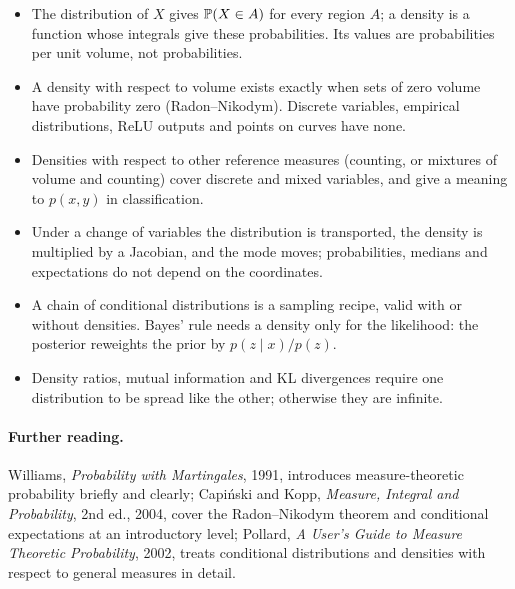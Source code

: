\begin{notechapter}
\begin{chaptersummary}
\begin{itemize}
  \item The distribution of $X$ gives $\mathbb{P}(X\in A)$ for every region $A$; a density is a function whose
        integrals give these probabilities. Its values are probabilities per unit volume, not probabilities.
  \item A density with respect to volume exists exactly when sets of zero volume have probability zero
        (Radon--Nikodym). Discrete variables, empirical distributions, ReLU outputs and points on curves
        have none.
  \item Densities with respect to other reference measures (counting, or mixtures of volume and counting)
        cover discrete and mixed variables, and give a meaning to $p(x, y)$ in classification.
  \item Under a change of variables the distribution is transported, the density is multiplied by a
        Jacobian, and the mode moves; probabilities, medians and expectations do not depend on the coordinates.
  \item A chain of conditional distributions is a sampling recipe, valid with or without densities. Bayes'
        rule needs a density only for the likelihood: the posterior reweights the prior by $p(z\mid x)/p(z)$.
  \item Density ratios, mutual information and KL divergences require one distribution to be spread like
        the other; otherwise they are infinite.
\end{itemize}
\end{chaptersummary}

\paragraph{Further reading.} Williams, \emph{Probability with Martingales}, 1991, introduces measure-theoretic
probability briefly and clearly; Capiński and Kopp, \emph{Measure, Integral and Probability}, 2nd ed., 2004,
cover the Radon--Nikodym theorem and conditional expectations at an introductory level; Pollard,
\emph{A User's Guide to Measure Theoretic Probability}, 2002, treats conditional distributions and densities
with respect to general measures in detail.
\end{notechapter}
